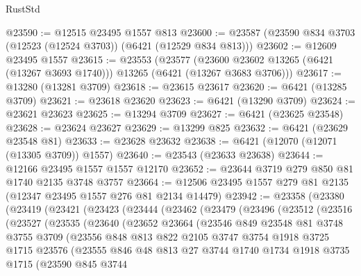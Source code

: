 \begin{lexlean}{RustStd}
\begin{coremodule}
@23590 := @12515 @23495 @1557 @813
@23600 := @23587 (@23590 @834 @3703 (@12523 (@12524 @3703)) (@6421 (@12529 @834 @813)))
@23602 := @12609 @23495 @1557
@23615 := @23553
    (@23577 (@23600 @23602 @13265 (@6421 (@13267 @3693 @1740))) @13265 (@6421 (@13267 @3683 @3706)))
@23617 := @13280 (@13281 @3709)
@23618 := @23615 @23617
@23620 := @6421 (@13285 @3709)
@23621 := @23618 @23620
@23623 := @6421 (@13290 @3709)
@23624 := @23621 @23623
@23625 := @13294 @3709
@23627 := @6421 (@23625 @23548)
@23628 := @23624 @23627
@23629 := @13299 @825
@23632 := @6421 (@23629 @23548 @81)
@23633 := @23628 @23632
@23638 := @6421 (@12070 (@12071 (@13305 @3709)) @1557)
@23640 := @23543 (@23633 @23638)
@23644 := @12166 @23495 @1557 @1557 @12170
@23652 := @23644 @3719 @279 @850 @81 @1740 @2135 @3748 @3757
@23664 := @12506 @23495 @1557 @279 @81 @2135 (@12347 @23495 @1557 @276 @81 @2134 @14479)
@23942 := @23358
    (@23380
      (@23419
        (@23421
          (@23423
            (@23444
              (@23462
                (@23479
                  (@23496
                    (@23512
                      (@23516
                        (@23527
                          (@23535
                            (@23640
                              (@23652
                                @23664
                                (@23546
                                  @849
                                  @23548
                                  @81
                                  @3748
                                  @3755
                                  @3709
                                  (@23556
                                    @848
                                    @813
                                    @822
                                    @2105
                                    @3747
                                    @3754
                                    @1918
                                    @3725
                                    @1715
                                    @23576
                                    (@23555
                                      @846
                                      @48
                                      @813
                                      @27
                                      @3744
                                      @1740
                                      @1734
                                      @1918
                                      @3735
                                      @1715
                                      (@23590
                                        @845
                                        @3744

\end{coremodule}
\end{lexlean}
